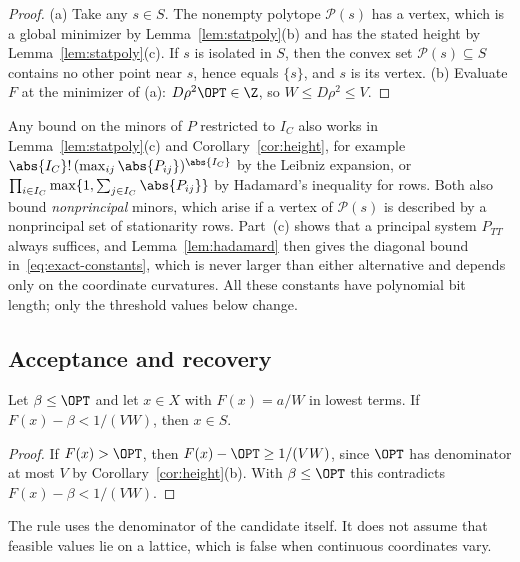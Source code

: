 \begin{proof}
(a) Take any $s\in S$. The nonempty polytope $\mathcal P(s)$ has a vertex,
which is a global minimizer by Lemma~\ref{lem:statpoly}(b) and has the
stated height by Lemma~\ref{lem:statpoly}(c). If $s$ is isolated in $S$, then
the convex set $\mathcal P(s)\subseteq S$ contains no other point near $s$,
hence equals $\{s\}$, and $s$ is its vertex.
(b) Evaluate $F$ at the minimizer of (a): $D\rho^2\OPT\in\Z$, so
$W\le D\rho^2\le V$.
\end{proof}

\begin{remark}\label{rem:heights}
Any bound on the minors of $P$ restricted to $I_C$ also works in
Lemma~\ref{lem:statpoly}(c) and Corollary~\ref{cor:height}, for example
$\abs{I_C}!\,(\max_{ij}\abs{P_{ij}})^{\abs{I_C}}$ by the Leibniz expansion, or
$\prod_{i\in I_C}\max\{1,\sum_{j\in I_C}\abs{P_{ij}}\}$ by Hadamard's
inequality for rows. Both also bound \emph{nonprincipal} minors, which arise
if a vertex of $\mathcal P(s)$ is described by a nonprincipal set of
stationarity rows. Part~(c) shows that a principal system $P_{TT}$ always
suffices, and Lemma~\ref{lem:hadamard} then gives the diagonal bound
in~\eqref{eq:exact-constants}, which is never larger than either
alternative and depends only on the coordinate curvatures. All these
constants have polynomial bit length; only the threshold values below
change.
\end{remark}

\subsection{Acceptance and recovery}

\begin{proposition}\label{prop:accept}
Let $\beta\le\OPT$ and let $x\in X$ with $F(x)=a/W$ in lowest terms. If
$F(x)-\beta<1/(VW)$, then $x\in S$.
\end{proposition}

\begin{proof}
If $F(x)>\OPT$, then $F(x)-\OPT\ge1/(VW)$, since $\OPT$ has denominator at
most $V$ by Corollary~\ref{cor:height}(b). With $\beta\le\OPT$ this
contradicts $F(x)-\beta<1/(VW)$.
\end{proof}

The rule uses the denominator of the candidate itself. It does not assume
that feasible values lie on a lattice, which is false when continuous
coordinates vary.

